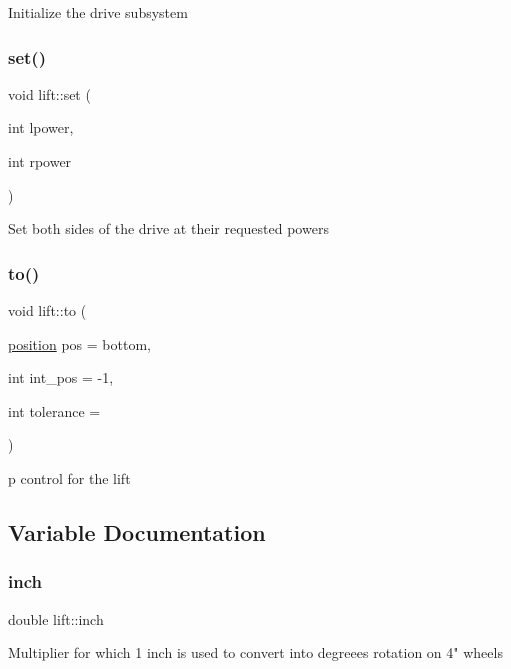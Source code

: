 Initialize the drive subsystem \mbox{\label{namespacelift_ac4499bdf3cd48c060118c4cbea45ff1c}} 
\subsubsection{\texorpdfstring{set()}{set()}}
{\footnotesize\ttfamily void lift\+::set (\begin{DoxyParamCaption}\item[{int}]{lpower,  }\item[{int}]{rpower }\end{DoxyParamCaption})}

Set both sides of the drive at their requested powers \mbox{\label{namespacelift_abbdfe6685b8239a74b18bb9d5ba80d02}} 
\subsubsection{\texorpdfstring{to()}{to()}}
{\footnotesize\ttfamily void lift\+::to (\begin{DoxyParamCaption}\item[{\hyperlink{namespacelift_a4a1c349e765b3b8489da50822876099d}{position}}]{pos = {\ttfamily bottom},  }\item[{int}]{int\+\_\+pos = {\ttfamily -\/1},  }\item[{int}]{tolerance = {} }\end{DoxyParamCaption})}

p control for the lift 

\subsection{Variable Documentation}
\mbox{\label{namespacelift_a3d44b39574f68db44182b8079f4fd5d0}} 
\subsubsection{\texorpdfstring{inch}{inch}}
{\footnotesize\ttfamily double lift\+::inch}

Multiplier for which 1 inch is used to convert into degreees rotation on 4" wheels \mbox{\label{namespacelift_acbf81adbb531b3d3f6d5b1ef946c81f7}} 
